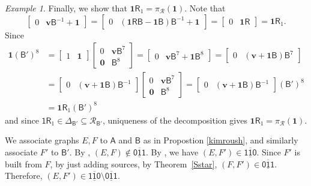 \documentclass[12pt]{amsbook}%
\theoremstyle{defin}
\theoremstyle{remark}
\newtheorem{examp}[theor]{Example}
\numberwithin{equation}{chapter}
\numberwithin{theor}{section}
\newcommand{\xyzrel}[1]{\mbox{$\overline{\underline{\mathsf{ #1}}}$}}
\begin{document}
\begin{examp}
Finally, we show that $\mathbf{1}\mathsf{R}_1 = \pi_\mathcal{R} (\mathbf{1})$.  Note that
$$
\begin{bmatrix} 0 & \mathbf{v}\mathsf{B}^{-1} + \mathbf{1}\end{bmatrix}  = \begin{bmatrix} 0 & (\mathbf{1} \mathsf{R}\mathsf{B}- \mathbf{1}\mathsf{B})\mathsf{B}^{-1} + \mathbf{1} \end{bmatrix} = \begin{bmatrix} 0 & \mathbf{1} \mathsf{R} \end{bmatrix} = \mathbf{1}\mathsf{R}_1.
$$
Since 
\begin{align*}
\mathbf{1} (\mathsf{B}')^8 &= \begin{bmatrix} 1 & \mathbf{1} \end{bmatrix} \begin{bmatrix} 0 & \mathbf{v} \mathsf{B}^{7} \\ \mathbf{0} & \mathsf{B}^8 \end{bmatrix} = \begin{bmatrix} 0 & \mathbf{v}\mathsf{B}^7 + \mathbf{1} \mathsf{B}^8 \end{bmatrix} = \begin{bmatrix} 0 & (\mathbf{v} + \mathbf{1} \mathsf{B})\mathsf{B}^7\end{bmatrix} \\
&= \begin{bmatrix} 0 & (\mathbf{v} + \mathbf{1} \mathsf{B}) \mathsf{B}^{-1} \end{bmatrix} \begin{bmatrix} 0 & \mathbf{v} \mathsf{B}^{7} \\ \mathbf{0} & \mathsf{B}^8 \end{bmatrix}  =\begin{bmatrix} 0 & (\mathbf{v} + \mathbf{1} \mathsf{B}) \mathsf{B}^{-1} \end{bmatrix}   (\mathsf{B}')^8 \\
&= \mathbf{1} \mathsf{R}_1(\mathsf{B}')^8
\end{align*}  
and since $\mathsf{1} \mathsf{R}_1 \in \Delta_{\mathsf{B}'} \subseteq \mathcal{R}_{\mathsf{B}'}$,  uniqueness of the decomposition gives $\mathbf{1}\mathsf{R}_1 = \pi_\mathcal{R} (\mathbf{1})$.

We associate graphs $E,F$ to $\mathsf A$ and $\mathsf B$ as in Propostion \ref{kimroush}, and similarly associate $F'$ to  $\mathsf{B}'$.  By \cite{khkfwr:wcfis}, $(E, F) \notin \xyzrel{011}$.  By \cite[Corollary~4.1]{obak:tsacsa}, we have $(E, F') \in \xyzrel{110}$.   Since $F'$ is built from $F$, by just adding sources, by Theorem~\ref{Sstar}, $(F, F')\in \xyzrel{011}$.  Therefore, $(E, F') \in \xyzrel{110} \setminus \xyzrel{011}$.
\end{examp}
\end{document}
